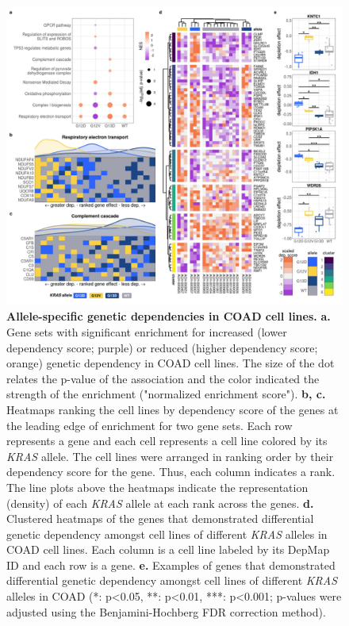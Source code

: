 \documentclass[english, 10pt, letterpaper]{article}
\newcommand{\KRAS}{\emph{KRAS}}
\begin{document}
\begin{figure}[h!]
\centering
\includegraphics[width=180mm]{figures/Fig_3.jpeg}
\caption{
    \textbf{Allele-specific genetic dependencies in COAD cell lines.}
    \textbf{a.} Gene sets with significant enrichment for increased (lower dependency score; purple) or reduced (higher dependency score; orange) genetic dependency in COAD cell lines. The size of the dot relates the p-value of the association and the color indicated the strength of the enrichment ("normalized enrichment score").
    \textbf{b, c.} Heatmaps ranking the cell lines by dependency score of the genes at the leading edge of enrichment for two gene sets. Each row represents a gene and each cell represents a cell line colored by its \KRAS{} allele. The cell lines were arranged in ranking order by their dependency score for the gene. Thus, each column indicates a rank. The line plots above the heatmaps indicate the representation (density) of each \KRAS{} allele at each rank across the genes.
    \textbf{d.} Clustered heatmaps of the genes that demonstrated differential genetic dependency amongst cell lines of different \KRAS{} alleles in COAD cell lines. Each column is a cell line labeled by its DepMap ID and each row is a gene.
    \textbf{e.} Examples of genes that demonstrated differential genetic dependency amongst cell lines of different \KRAS{} alleles in COAD (*: p<0.05, **: p<0.01, ***: p<0.001; p-values were adjusted using the Benjamini-Hochberg FDR correction method).
}
\label{fig:coad-dependency-main}
\end{figure}
\newpage
\end{document}
